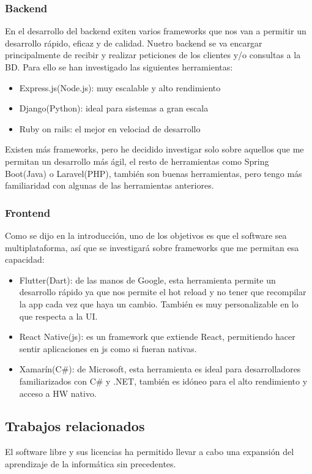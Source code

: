 \subsubsection{Backend}

En el desarrollo del backend exiten varios frameworks que nos van a permitir un desarrollo rápido, eficaz y de calidad. Nuetro backend se va encargar principalmente de recibir y realizar peticiones de los clientes y/o consultas a la BD. Para ello se han investigado las siguientes herramientas:

\begin{itemize}
	\item Express.js(Node.js): muy escalable y alto rendimiento
	\item Django(Python): ideal para sistemas a gran escala
	\item Ruby on rails: el mejor en velociad de desarrollo
\end{itemize}

Existen más frameworks, pero he decidido investigar solo sobre aquellos que me permitan un desarrollo más ágil, el resto de herramientas como Spring Boot(Java) o Laravel(PHP), también son buenas herramientas, pero tengo más familiaridad con algunas de las herramientas anteriores.

\subsubsection{Frontend}

Como se dijo en la introducción, uno de los objetivos es que el software sea multiplataforma, así que se investigará sobre frameworks que me permitan esa capacidad:

\begin{itemize}
	\item Flutter(Dart): de las manos de Google, esta herramienta permite un desarrollo rápido ya que nos permite el hot reload y no tener que recompilar la app cada vez que haya un cambio. También es muy personalizable en lo que respecta a la UI.
	\item React Native(js): es un framework que extiende React, permitiendo hacer sentir aplicaciones en js como si fueran nativas.
	\item Xamarín(C#): de Microsoft, esta herramienta es ideal para desarrolladores familiarizados con C# y .NET, también es idóneo para el alto rendimiento y acceso a HW nativo.
\end{itemize}

\subsection{Trabajos relacionados}
El software libre y sus licencias \cite{gplv3} ha permitido llevar a cabo una expansión del aprendizaje de la informática sin precedentes.
